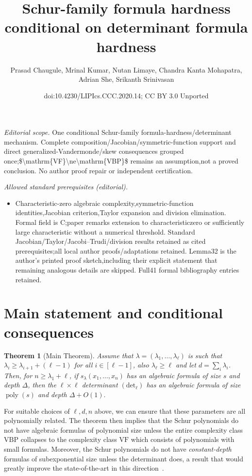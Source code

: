 \documentclass[10pt,a4paper]{article}
\title{Schur-family formula hardness conditional on determinant formula hardness}
\author{Prasad Chaugule, Mrinal Kumar, Nutan Limaye, Chandra Kanta Mohapatra, Adrian She, Srikanth Srinivasan}
\date{doi:10.4230/LIPIcs.CCC.2020.14; CC BY 3.0 Unported}
\newtheorem{theorem}{Theorem}
\theoremstyle{definition}
\DeclareMathOperator{\poly}{poly}
\begin{document}
\maketitle
\noindent\textit{Editorial scope.} One conditional Schur-family formula-hardness/determinant mechanism. Complete composition/Jacobian/symmetric-function support and direct generalized-Vandermonde/skew consequences grouped once;\$\textbackslash{}mathrm\{VF\}\textbackslash{}ne\textbackslash{}mathrm\{VBP\}\$ remains an assumption,not a proved conclusion. No author proof repair or independent certification.\par\medskip
\noindent\textit{Allowed standard prerequisites (editorial).}\begin{itemize}
\item Characteristic-zero algebraic complexity,symmetric-function identities,Jacobian criterion,Taylor expansion and division elimination. Formal field is C;paper remarks extension to characteristiczero or sufficiently large characteristic without a numerical threshold. Standard Jacobian/Taylor/Jacobi–Trudi/division results retained as cited prerequisites;all local author proofs/adaptations retained. Lemma32 is the author's printed proof sketch,including their explicit statement that remaining analogous details are skipped. Full41 formal bibliography entries retained.
\end{itemize}\medskip
\section*{Main statement and conditional consequences}
\setcounter{theorem}{2}
\begin{theorem}[Main Theorem]
\label{thm:main-intro}
Assume that $\lambda= (\lambda_1,\ldots,\lambda_\ell)$ is such that $\lambda_i \geq \lambda_{i+1}+(\ell-1)$ for all $i \in [\ell-1]$, also $\lambda_{\ell} \geq \ell$ and let $d = \sum_i \lambda_i$. Then, for $n \geq \lambda_1 + \ell$, if $s_\lambda(x_1,\ldots,x_n)$ has an algebraic formula of size $s$ and depth $\Delta$, then the $\ell\times \ell$ determinant $(\mathrm{det}_\ell )$ has an algebraic formula of size $\poly(s)$ and depth $\Delta + O(1).$
\end{theorem}


For suitable choices of $\ell,d,n$ above, we can ensure that these parameters are all polynomially related. The theorem then implies that the Schur polynomials do not have algebraic formulas of polynomial size unless the entire complexity class $\mathrm{VBP}$ collapses to the complexity class $\mathrm{VF}$ which consists of polynomials with small formulas. Moreover, the Schur polynomials do not have  \emph{constant-depth} formulas of subexponential size unless the determinant does, a result that would greatly improve the state-of-the-art in this direction~\cite{r16}. 
\end{document}
